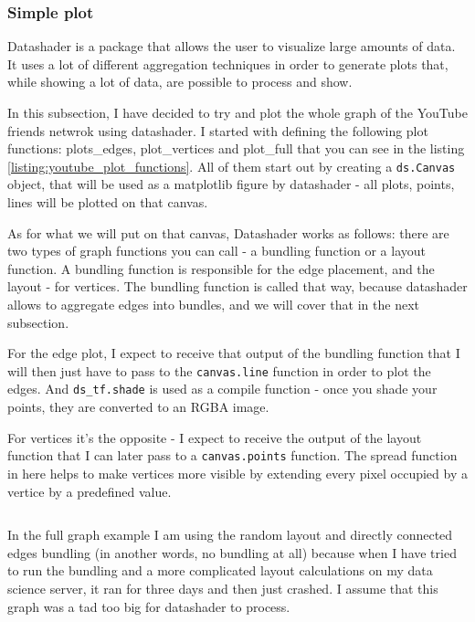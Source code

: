 \documentclass[12pt, a4paper]{article}
\begin{document}
\subsubsection{Simple plot}


Datashader is a package that allows the user to visualize large amounts of data. It uses a lot of different aggregation techniques in order to generate plots that, while showing a lot of data, are possible to process and show.


In this subsection, I have decided to try and plot the whole graph of the YouTube friends netwrok using datashader. I started with defining the following plot functions: plots\_edges, plot\_vertices and plot\_full that you can see in the listing \ref{listing:youtube_plot_functions}. All of them start out by creating a \texttt{ds.Canvas} object, that will be used as a matplotlib figure by datashader - all plots, points, lines will be plotted on that canvas.

As for what we will put on that canvas, Datashader works as follows: there are two types of graph functions you can call - a bundling function or a layout function. A bundling function is responsible for the edge placement, and the layout - for vertices. The bundling function is called that way, because datashader allows to aggregate edges into bundles, and we will cover that in the next subsection.

For the edge plot, I expect to receive that output of the bundling function that I will then just have to pass to the \texttt{canvas.line} function in order to plot the edges. And \texttt{ds\_tf.shade} is used as a compile function - once you shade your points, they are converted to an RGBA image.


For vertices it's the opposite - I expect to receive the output of the layout function that I can later pass to a \texttt{canvas.points} function.
The spread function in here helps to make vertices more visible by extending every pixel occupied by a vertice by a predefined value.

\bgroup
  \inputminted[linenos, breaklines=true, fontsize=\scriptsize]{python}{src/youtube/plot_functions.py}
  \label{listing:youtube_plot_functions}
\egroup

In the full graph example I am using the random layout and directly connected edges bundling (in another words, no bundling at all) because when I have tried to run the bundling and a more complicated layout calculations on my data science server, it ran for three days and then just crashed. I assume that this graph was a tad too big for datashader to process.
\end{document}
